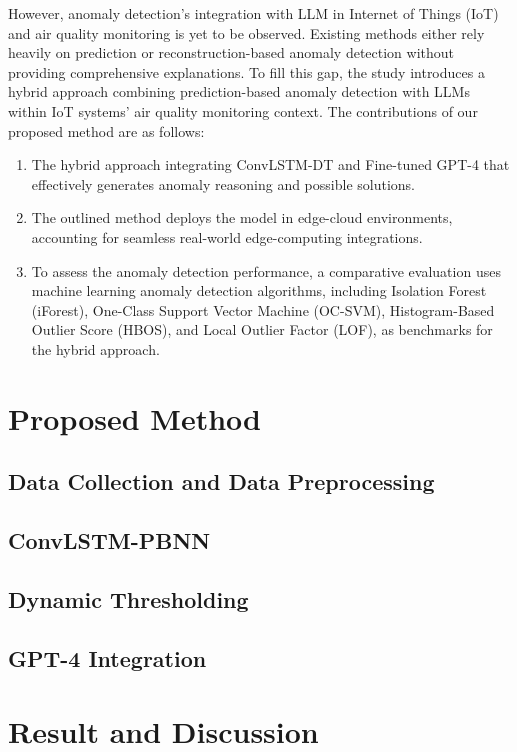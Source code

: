 \documentclass[final,3p,times,twocolumn]{elsarticle}
\begin{document}
However, anomaly detection's integration with LLM in Internet of Things (IoT) and air quality monitoring is yet to be observed. Existing methods either rely heavily on prediction or reconstruction-based anomaly detection without providing comprehensive explanations. To fill this gap, the study introduces a hybrid approach combining prediction-based anomaly detection with LLMs within IoT systems' air quality monitoring context. 
The contributions of our proposed method are as follows: 
\begin{enumerate}
\item The hybrid approach integrating ConvLSTM-DT and Fine-tuned GPT-4 that effectively generates anomaly reasoning and possible solutions. 
\item The outlined method deploys the model in edge-cloud environments, accounting for seamless real-world edge-computing integrations. 
\item To assess the anomaly detection performance, a comparative evaluation uses machine learning anomaly detection algorithms, including Isolation Forest (iForest), One-Class Support Vector Machine (OC-SVM), Histogram-Based Outlier Score (HBOS), and Local Outlier Factor (LOF), as benchmarks for the hybrid approach.
\end{enumerate}
\section{Proposed Method}\label{sec2}

\subsection{Data Collection and Data Preprocessing}
\subsection{ConvLSTM-PBNN}
\subsection{Dynamic Thresholding}
\subsection{GPT-4 Integration}


\section{Result and Discussion}\label{sec3}
\end{document}
